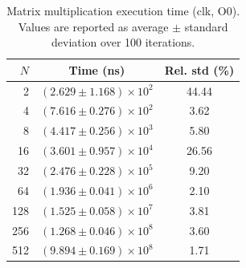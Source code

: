 \begin{table}[ht]
    \centering
    \caption{Matrix multiplication execution time (clk, O0). Values are reported as average $\pm$ standard deviation over 100 iterations.}
    \label{tab:mm-clk-o0}
    \begin{tabular}{rcc}
        \hline
        $N$ & Time (ns) & Rel. std (\%) \\
        \hline
        2 & $(2.629 \pm 1.168) \times 10^{2}$ & 44.44 \\
        4 & $(7.616 \pm 0.276) \times 10^{2}$ & 3.62 \\
        8 & $(4.417 \pm 0.256) \times 10^{3}$ & 5.80 \\
        16 & $(3.601 \pm 0.957) \times 10^{4}$ & 26.56 \\
        32 & $(2.476 \pm 0.228) \times 10^{5}$ & 9.20 \\
        64 & $(1.936 \pm 0.041) \times 10^{6}$ & 2.10 \\
        128 & $(1.525 \pm 0.058) \times 10^{7}$ & 3.81 \\
        256 & $(1.268 \pm 0.046) \times 10^{8}$ & 3.60 \\
        512 & $(9.894 \pm 0.169) \times 10^{8}$ & 1.71 \\
        \hline
    \end{tabular}
\end{table}
